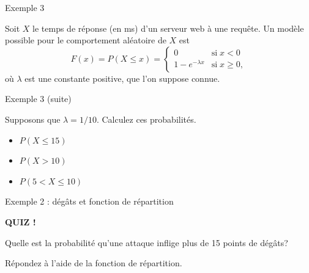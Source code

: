 \documentclass{BeamerTemplate}
\newcommand{\cibleReponse}{}
\newcommand{\lienreponse}[1]{\gdef\cibleReponse{#1}}
\begin{document}
\begin{frame}[t,label=ex3]{Exemple 3}

{\small
Soit $X$ le temps de réponse (en ms) d'un serveur web à une requête. Un modèle possible pour le comportement aléatoire de $X$ est
 $$F(x)=P(X\le x)=\left\{\begin{array}{ll}
 0 & \textrm{si} \; x<0\\
 1-e^{-\lambda x} & \textrm{si} \; x\ge0,
 \end{array}\right.$$
où $\lambda$ est une constante positive, que l'on suppose connue.}


\end{frame}
\begin{frame}[t]{Exemple 3 (suite)}

Supposons que $\lambda=1/10$. Calculez ces probabilités.

\begin{itemize}\itemsep=12mm
\item $P(X\leq 15)$
\item $P(X> 10)$
\item $P(5<X\leq 10)$
\end{itemize}

\vspace{5mm}
\lienreponse{rep-ex1}
\end{frame}


\begin{frame}[t,label=quizgain]{Exemple 2 : dégâts et fonction de répartition}

\centerline{\LARGE\bfseries\alert{QUIZ !}}
Quelle est la probabilité qu'une attaque inflige plus de 15 points de dégâts?

\medskip
Répondez à l'aide de la fonction de répartition.

\vspace{5cm}
\lienreponse{rep-quiz}
\end{frame}
\end{document}
